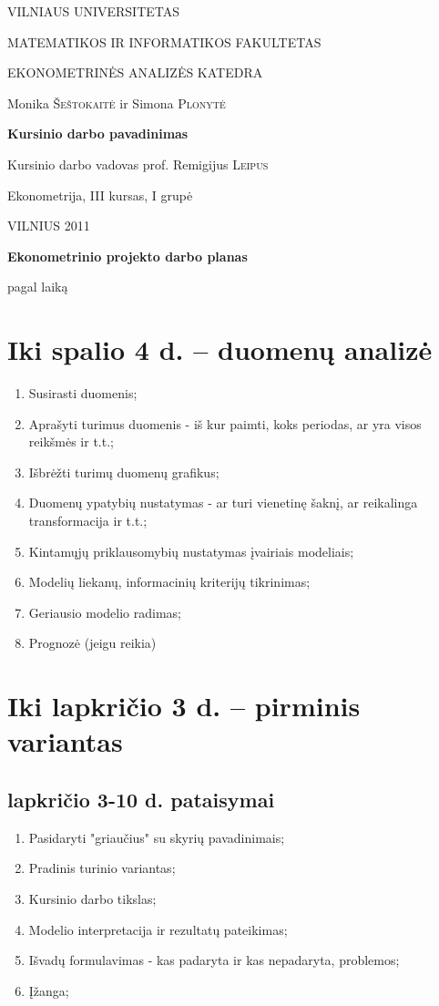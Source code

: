 \documentclass[a4paper]{article}
\begin{document}
\begin{titlepage}
\centerline{ \large VILNIAUS UNIVERSITETAS}
\bigskip
\centerline{\large MATEMATIKOS IR INFORMATIKOS FAKULTETAS}
\smallskip

\centerline{\large  EKONOMETRINĖS ANALIZĖS KATEDRA}
\vskip 200pt
\centerline{ \large Monika \textsc{Šeštokaitė} ir \large Simona \textsc{Plonytė}}
\vskip 50pt
\centerline{\bf \Large Kursinio darbo pavadinimas}
\bigskip
\vskip 25pt
\centerline{Kursinio darbo vadovas prof. \large {Remigijus} \textsc{Leipus}}
\vskip 25pt
\hfill Ekonometrija, III kursas, I grupė
\vskip 100pt
\centerline{\large VILNIUS 2011}
\end{titlepage}

\pagebreak

\centerline{\bf \Large Ekonometrinio projekto darbo planas}
\centerline{pagal laiką}

\section{ Iki spalio 4 d. -- duomenų analizė }


\begin{enumerate}
\item {Susirasti duomenis;}
\item {Aprašyti turimus duomenis - iš kur paimti, koks periodas, ar yra visos reikšmės ir t.t.;}
\item {Išbrėžti turimų duomenų grafikus;}
\item {Duomenų ypatybių nustatymas - ar turi vienetinę šaknį, ar reikalinga transformacija ir t.t.;}
\item {Kintamųjų priklausomybių nustatymas įvairiais modeliais;}
\item {Modelių liekanų, informacinių kriterijų tikrinimas;}
\item {Geriausio modelio radimas;}
\item {Prognozė (jeigu reikia)}
\end{enumerate}


\section{ Iki lapkričio 3 d. -- pirminis variantas}
\subsection{lapkričio 3-10 d. pataisymai}

\begin{enumerate}
\item {Pasidaryti "griaučius" su skyrių pavadinimais;}
\item {Pradinis turinio variantas;}
\item {Kursinio darbo tikslas;} 
\item {Modelio interpretacija ir rezultatų pateikimas;}
\item {Išvadų formulavimas - kas padaryta ir kas nepadaryta, problemos;}
\item {Įžanga;}
\end{enumerate}
\end{document}
